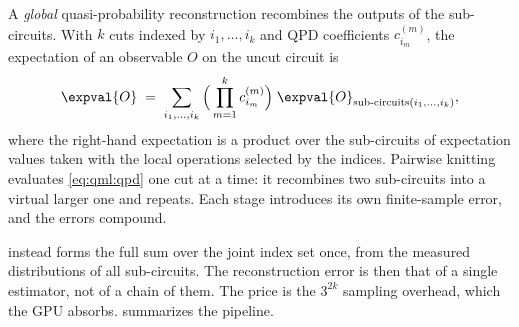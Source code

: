 A \emph{global} quasi-probability reconstruction recombines the outputs of the sub-circuits. With $k$ cuts indexed by $i_1,\dots,i_k$ and QPD coefficients $c^{(m)}_{i_m}$, the expectation of an observable $O$ on the uncut circuit is
\begin{equation}\label{eq:qml:qpd}
\expval{O} \;=\; \sum_{i_1,\dots,i_k} \Big(\prod_{m=1}^{k} c^{(m)}_{i_m}\Big)\; \expval{O}_{\text{sub-circuits}(i_1,\dots,i_k)},
\end{equation}
where the right-hand expectation is a product over the sub-circuits of expectation values taken with the local operations selected by the indices. Pairwise knitting evaluates \cref{eq:qml:qpd} one cut at a time: it recombines two sub-circuits into a virtual larger one and repeats. Each stage introduces its own finite-sample error, and the errors compound.

\shardq{} instead forms the full sum over the joint index set once, from the measured distributions of all sub-circuits. The reconstruction error is then that of a single estimator, not of a chain of them. The price is the $3^{2k}$ sampling overhead, which the GPU absorbs.  summarizes the pipeline.

